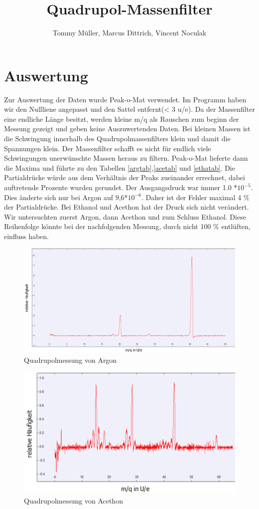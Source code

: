 \documentclass[10pt,a4paper]{article}
\author{Tommy Müller, Marcus Dittrich, Vincent Noculak}
\title{Quadrupol-Massenfilter}
\begin{document}
\section{Auswertung}

Zur Auswertung der Daten wurde Peak-o-Mat verwendet. Im Programm haben wir den Nullliene angepasst und den Sattel entfernt(< 3 u/e). Da der Massenfilter eine endliche Länge besitzt, werden kleine m/q als Rauschen zum beginn der Messung gezeigt und geben keine Auszuwertenden Daten. Bei kleinen Massen ist die Schwingung innerhalb des Quadrupolmassenfilters klein und damit die Spannungen klein. Der Massenfilter schafft es nicht für endlich viele Schwingungen unerwünschte Massen heraus zu filtern. Peak-o-Mat lieferte dann die Maxima und führte zu den Tabellen \ref{argtab},\ref{acetab} und \ref{ethatab}. Die Partialdrücke würde aus dem Verhältnis der Peaks zueinander errechnet, dabei auftretende Prozente wurden gerundet. Der Ausgangsdruck war immer 1.0 *$10^{-5}$. Dies änderte sich nur bei Argon auf 9,6*$10^{-6}$. Daher ist der Fehler maximal 4 \% der Partialdrücke. Bei Ethanol und Acethon hat der Druck sich nicht verändert.
Wir untersuchten zuerst Argon, dann Acethon und zum Schluss Ethanol. Diese Reihenfolge könnte bei der nachfolgenden Messung, durch nicht 100 \% entlüften, einfluss haben.


\begin{figure}[h]
	\includegraphics[scale = 0.2]{argon1.png}
	\centering
	\caption{Quadrupolmessung von Argon}
	\label{arg}
\end{figure}

\begin{figure}[h]
	\includegraphics[scale = 0.3]{acethon1.png}
	\centering
	\caption{Quadrupolmessung von Acethon}
	\label{arg}
\end{figure}
\end{document}
